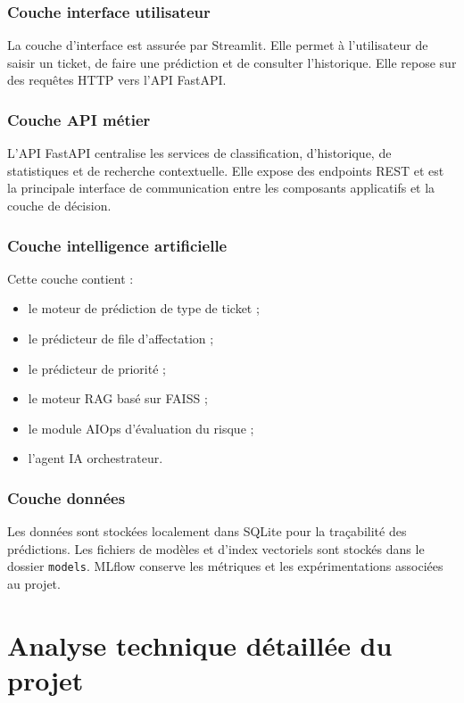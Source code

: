 \documentclass[11pt,a4paper]{report}
\begin{document}
\subsection{Couche interface utilisateur}
La couche d’interface est assurée par Streamlit. Elle permet à l’utilisateur de saisir un ticket, de faire une prédiction et de consulter l’historique. Elle repose sur des requêtes HTTP vers l’API FastAPI.

\subsection{Couche API métier}
L’API FastAPI centralise les services de classification, d’historique, de statistiques et de recherche contextuelle. Elle expose des endpoints REST et est la principale interface de communication entre les composants applicatifs et la couche de décision.

\subsection{Couche intelligence artificielle}
Cette couche contient :
\begin{itemize}[leftmargin=1.3em]
    \item le moteur de prédiction de type de ticket ;
    \item le prédicteur de file d’affectation ;
    \item le prédicteur de priorité ;
    \item le moteur RAG basé sur FAISS ;
    \item le module AIOps d’évaluation du risque ;
    \item l’agent IA orchestrateur.
\end{itemize}

\subsection{Couche données}
Les données sont stockées localement dans SQLite pour la traçabilité des prédictions. Les fichiers de modèles et d’index vectoriels sont stockés dans le dossier \texttt{models}. MLflow conserve les métriques et les expérimentations associées au projet.

\chapter{Analyse technique détaillée du projet}
\end{document}
